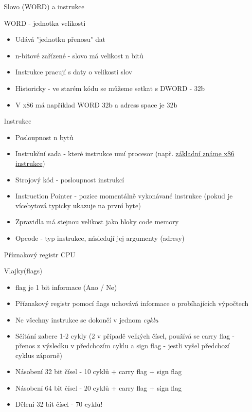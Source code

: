 \documentclass[9pt]{beamer}
\begin{document}
\begin{frame}{Slovo (WORD) a instrukce}
    \begin{block}{WORD - jednotka velikosti}
        \begin{itemize}
            \item Udává "jednotku přenosu" dat
            \item n-bitové zařízené - slovo má velikost n bitů
            \item Instrukce pracují s daty o velikosti slov
            \item Historicky - ve starém kódu se můžeme setkat s DWORD - 32b
            \item V x86 má například WORD 32b a adress space je 32b
        \end{itemize}
    \end{block}
    \pause
    \begin{block}{Instrukce}
        \begin{itemize}
            \item Posloupnost n bytů
            \item Instrukční sada - které instrukce umí procesor (např. \href{https://en.wikipedia.org/wiki/X86_instruction_listings}{základní známe x86 instrukce})
            \item Strojový kód - posloupnost instrukcí
            \item Instruction Pointer - pozice momentálně vykonávané instrukce (pokud je vícebytová typicky ukazuje na první byte)
            \item Zpravidla má stejnou velikost jako bloky code memory
            \item Opcode - typ instrukce, následují jej argumenty (adresy)
        \end{itemize}
    \end{block}
\end{frame}

\begin{frame}{Příznakový registr CPU}
\begin{block}{Vlajky(flags)}
    \begin{itemize}
        \item flag je 1 bit informace (Ano / Ne)
        \item Příznakový registr pomocí flags uchovává
        informace o probíhajících výpočtech
        \item Ne všechny instrukce se dokončí v jednom \textit{cyklu}
        \item Sčítání zabere 1-2 cykly (2 v případě velkých čísel, používá se carry flag - přenos z výsledku v předchozím cyklu a sign flag - jestli vyšel předchozí cyklus záporně)
        \item Násobení 32 bit čísel - 10 cyklů + carry flag + sign flag
        \item Násobení 64 bit čísel - 20 cyklů + carry flag + sign flag
        \item Dělení 32 bit čísel - 70 cyklů!
        
    \end{itemize}
\end{block}
    
\end{frame}
\end{document}
